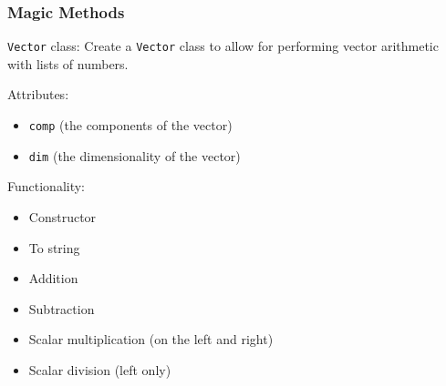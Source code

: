 \documentclass{beamer}
\newcommand{\code}[1]{\texttt{#1}}
\begin{document}
\begin{frame}	
	\frametitle{Magic Methods}
	
	\begin{exampleblock}{\code{Vector} class:}
		Create a \code{Vector} class to allow for performing vector arithmetic with lists of numbers.
		
		\vspace{10pt}
		Attributes:
		\begin{itemize}
			\item \code{comp} (the components of the vector)
			\item \code{dim} (the dimensionality of the vector)
		\end{itemize}
		Functionality:
		\begin{itemize}
			\item Constructor
			\item To string
			\item Addition
			\item Subtraction
			\item Scalar multiplication (on the left and right)
			\item Scalar division (left only)
		\end{itemize}
	\end{exampleblock}
	
\end{frame}
\end{document}
